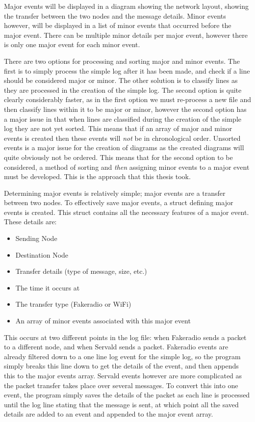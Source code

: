 Major events will be displayed in a diagram showing the network layout, showing the transfer between the two nodes and the message details. 
Minor events however, will be displayed in a list of minor events that occurred before the major event.
There can be multiple minor details per major event, however there is only one major event for each minor event.

There are two options for processing and sorting major and minor events.
The first is to simply process the simple log after it has been made, and check if a line should be considered major or minor. 
The other solution is to classify lines as they are processed in the creation of the simple log.
The second option is quite clearly considerably faster, as in the first option we must re-process a new file and then classify lines within it to be major or minor, however the second option has a major issue in that when lines are classified during the creation of the simple log they are not yet sorted.
This means that if an array of major and minor events is created then these events will \emph{not} be in chronological order.
Unsorted events is a major issue for the creation of diagrams as the created diagrams will quite obviously not be ordered.
This means that for the second option to be considered, a method of sorting and \emph{then} assigning minor events to a major event must be developed.
This is the approach that this thesis took.

Determining major events is relatively simple; major events are a transfer between two nodes.
To effectively save major events, a struct defining major events is created.
This struct contains all the necessary features of a major event. These details are:
\begin{itemize}
    \item Sending Node
    \item Destination Node
    \item Transfer details (type of message, size, etc.)
    \item The time it occurs at
    \item The transfer type (Fakeradio or WiFi)
    \item An array of minor events associated with this major event
\end{itemize}
This occurs at two different points in the log file: when Fakeradio sends a packet to a different node, and when Servald sends a packet.
Fakeradio events are already filtered down to a one line log event for the simple log, so the program simply breaks this line down to get the details of the event, and then appends this to the major events array.
Servald events however are more complicated as the packet transfer takes place over several messages.
To convert this into one event, the program simply saves the details of the packet as each line is processed until the log line stating that the message is sent, at which point all the saved details are added to an event and appended to the major event array.


